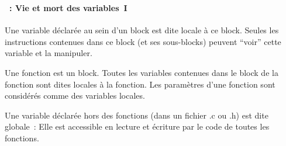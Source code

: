\begin{frame}
  \frametitle{\secname}
  \framesubtitle{\subsecname~: Vie et mort des variables~I}

  Une variable déclarée au sein d'un block est dite locale à ce block. Seules les instructions contenues dans ce block (et ses sous-blocks) peuvent ``voir'' cette variable et la manipuler. 
  \vspace{0.5cm}
  \par
  Une fonction est un block. Toutes les variables contenues dans le block de la fonction sont dites locales à la fonction. 
  Les paramètres d'une fonction sont considérés comme des variables locales.
  \vspace{0.5cm}
  \par
  Une variable déclarée hors des fonctions (dans un fichier .c ou .h) est dite globale~: Elle est accessible en lecture et écriture par le code de toutes les fonctions.
  
\end{frame}

